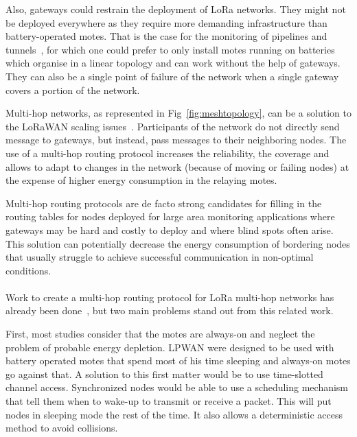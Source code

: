 Also, gateways could restrain the deployment of LoRa networks.
They might not be deployed everywhere as they require more demanding infrastructure
than battery-operated motes.
That is the case for the monitoring of pipelines and tunnels~\cite{Abrardo_2019},
for which one could prefer to only install motes running on batteries
which organise in a linear topology and can work without the help of gateways.
They can also be a single point of failure of the network when a single
gateway covers a portion of the network.



Multi-hop networks, as represented in Fig~\ref{fig:meshtopology}, can be a solution to
the LoRaWAN scaling issues~\cite{8115756}.
Participants of the network do not directly send message to gateways, but
instead, pass messages to their neighboring nodes.
The use of a multi-hop routing protocol increases the reliability, the coverage
and allows to adapt to changes in the network (because of moving or failing nodes)
at the expense of higher energy consumption in the relaying motes.

Multi-hop routing protocols are de facto strong candidates for filling in the
routing tables for nodes deployed for large area monitoring
applications where gateways may be hard and costly to deploy and where blind
spots often arise.
This solution can potentially decrease the energy consumption of bordering
nodes that usually struggle to achieve successful communication in non-optimal
conditions.

\paragraph{}

Work to create a multi-hop routing protocol for LoRa multi-hop networks has
already been done~\cite{8115756, DIAS2018424, 8856256, Abrardo_2019, duong2018},
but two main problems stand out from this related work.

First, most studies consider that the motes are always-on and
neglect the problem of probable energy depletion.
LPWAN were designed to be used with battery operated motes that spend most of
his time sleeping and always-on motes go against that.
A solution to this first matter would be to use time-slotted channel access.
Synchronized nodes would be able to use a scheduling mechanism that tell them
when to wake-up to transmit or receive a packet.
This will put nodes in sleeping mode the rest of the time.
It also allows a deterministic access method to avoid collisions.

